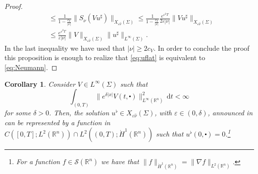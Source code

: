 \documentclass[10pt,a4paper]{amsart}
\newtheorem{proposition}{Proposition}[section]
\newtheorem{corollary}[proposition]{Corollary}
\theoremstyle{remark}
\theoremstyle{definition}
\newcommand{\R}{\mathbb{R}}
\newcommand{\dd}{\mathrm{d}}
\newcommand{\tm}{\mathrm{t}}
\newcommand{\marnote}[1]{\marginpar{\footnotesize #1}} %
\begin{document}
\begin{proof}
\begin{align*}
 &\leq \frac{1}{1-\frac{c_V}{  |\nu|}} \| S_\nu (V u^\sharp)\|_{X_{\varepsilon \hat{\nu}}(\Sigma)} \leq \frac{1}{1-\frac{c_V}{  |\nu|}} \frac{e^{\varepsilon^2 T}}{  2 \varepsilon |\nu|} \| V u^\sharp\|_{X_{\varepsilon \hat{\nu}}(\Sigma)}\\
   &\leq \frac{e^{\varepsilon^2 T}}{\varepsilon |\nu|} \| V \|_{X_{\varepsilon \hat{\nu}}(\Sigma)} \| u^\sharp\|_{L^\infty(\Sigma)}.
    \end{align*}
    In the last inequality we have used that $|\nu| \geq 2 c_V$.
    In order to conclude the proof this proposition is enough to realize that \eqref{eq:uflat} is equivalent to \eqref{eq:Neumann}.
\end{proof}
%
%
%

%
%
%
\begin{corollary}\label{cor:regularity_uflat}\sl 
Consider $V \in L^\infty (\Sigma) $ such that
\begin{equation*}
\int_{(0,T)} \| e^{\delta |x|} V(t, \centerdot) \|_{L^\infty (\R^n)}^2 \, \dd t < \infty
\end{equation*}
for some $\delta > 0$. Then, the solution $u^\flat \in X_{\varepsilon \hat \nu} (\Sigma)$, with
$\varepsilon \in (0, \delta)$, announced in 
can be represented by a function in $C([0, T]; L^2(\R^n))\cap L^2((0,T); \dot H^1(\R^n))$ such that 
$u^\flat(0,\centerdot) = 0$.\footnote{For a function $f \in \mathcal{S}(\R^n)$ we have that
$\| f \|_{\dot H^1 (\R^n)} = \| \nabla f  \|_{L^2(\R^n)}$.}
\end{corollary}
\end{document}
